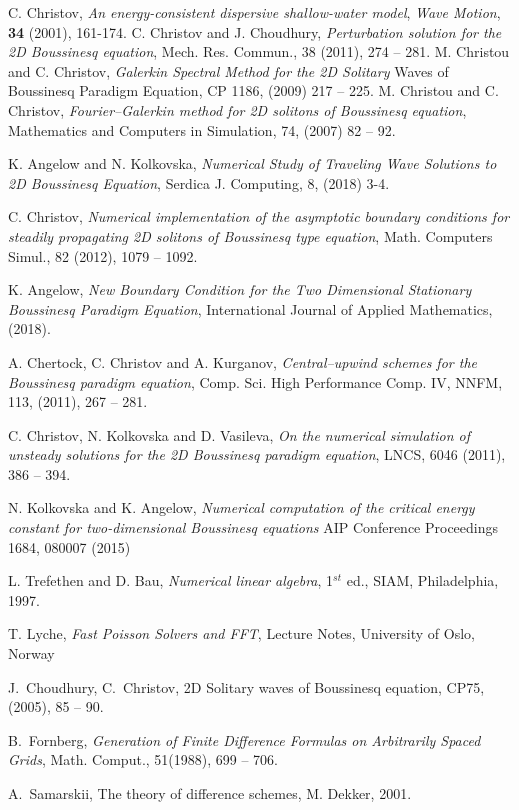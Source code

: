 \documentclass[11pt,a4paper,twoside]{article}
\begin{document}
\begin{thebibliography}{99}

C. Christov, 
\emph{An energy-consistent dispersive shallow-water model}, 
{\it Wave Motion}, \textbf{34} (2001), 161-174.
C. Christov and J. Choudhury, 
\emph{Perturbation solution  for the 2D Boussinesq equation},       
Mech. Res. Commun., 38 (2011),  274 -- 281.
M. Christou and C. Christov, 
\emph{Galerkin Spectral Method for the 2D Solitary}
Waves of Boussinesq Paradigm Equation, CP 1186, (2009) 217 -- 225.
M. Christou and C. Christov, 
\emph{Fourier–Galerkin method for 2D solitons of Boussinesq equation}, 
Mathematics and Computers in Simulation, 74, (2007) 82 -- 92.

K. Angelow and N. Kolkovska, 
\emph{Numerical Study of Traveling Wave Solutions to 2D Boussinesq Equation},
Serdica J. Computing,  8, (2018) 3-4.

C. Christov, 
\emph{Numerical implementation of the asymptotic boundary conditions
for steadily propagating 2D solitons of Boussinesq type equation},       
Math. Computers  Simul., 82 (2012),  1079 -- 1092.

K. Angelow, 
\emph{New Boundary Condition for the Two Dimensional Stationary Boussinesq Paradigm Equation},
International Journal of Applied Mathematics, (2018).

A. Chertock, C. Christov and A. Kurganov, 
\emph{Central--upwind schemes for the  Boussinesq paradigm equation},
Comp. Sci. High Performance Comp. IV, NNFM, 113, (2011), 267 -- 281.

C. Christov, N. Kolkovska and D. Vasileva, 
\emph{On the numerical simulation of unsteady solutions for the 2D Boussinesq paradigm equation},
LNCS, 6046  (2011), 386 -- 394.

N. Kolkovska and K. Angelow,
\emph{Numerical computation of the critical energy constant for two-dimensional Boussinesq equations}
AIP Conference Proceedings 1684, 080007 (2015)

L.  Trefethen and D. Bau,
\emph{Numerical linear algebra},
1$^{st}$ ed., SIAM, Philadelphia, 1997.

T. Lyche,
\emph{Fast Poisson Solvers and FFT}, 
Lecture Notes, University of Oslo, Norway

J.~Choudhury, C.~Christov, 2D  Solitary waves of  Boussinesq equation, CP75, (2005), 85 -- 90.
 
B.~Fornberg, 
\emph{Generation of Finite Difference Formulas on Arbitrarily Spaced Grids}, 
Math. Comput., 51(1988),  699 -- 706.

A.~Samarskii, The theory of difference schemes, M. Dekker,  2001.

\end{thebibliography}



\EndPaper%

\end{document}
